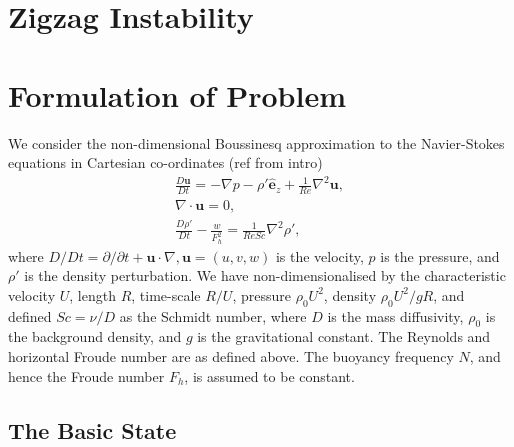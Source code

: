 \section{Zigzag Instability}

\section{Formulation of Problem}
We consider the non-dimensional Boussinesq approximation to the Navier-Stokes equations in Cartesian co-ordinates (ref from intro)
\begin{align}
\frac{D\bm{u}}{Dt} = -\nabla p - \rho'\hat{\bm{e}}_{z} + \frac{1}{Re}\nabla^{2} \bm{u},\\
\nabla \cdot \bm{u}=0,\\
\frac{D\rho'}{Dt} -\frac{w}{F_{h}^{2}} = \frac{1}{ReSc}\nabla^{2} \rho',
\end{align}
where $D/Dt=\partial/\partial t + \bm{u}\cdot \nabla, \bm{u}=(u,v,w)$ is the velocity, $p$ is the pressure, and $\rho'$ is the density perturbation. We have non-dimensionalised by the characteristic velocity $U$, length $R$, time-scale $R/U$, pressure $\rho_{0}U^{2}$, density $\rho_{0}U^{2}/gR$, and defined $Sc=\nu /D$ as the Schmidt number, where $D$ is the mass diffusivity, $\rho_{0}$ is the background density, and $g$ is the gravitational constant. The Reynolds and horizontal Froude number are as defined above. The buoyancy frequency $N$, and hence the Froude number $F_{h}$, is assumed to be constant. 

\subsection{The Basic State}

